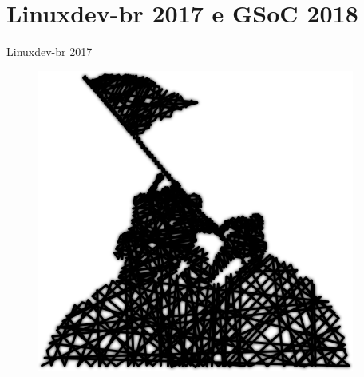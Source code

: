\documentclass[10pt, compress, aspectratio=169]{beamer}
\begin{document}
\section{Linuxdev-br 2017 e GSoC 2018}
\begin{frame}{Linuxdev-br 2017}
  \begin{figure}
    \centering
    \includegraphics[width=\linewidth,
                     height=0.8\textheight,
                     keepaspectratio]{together}
  \end{figure}
\end{frame}
\end{document}
